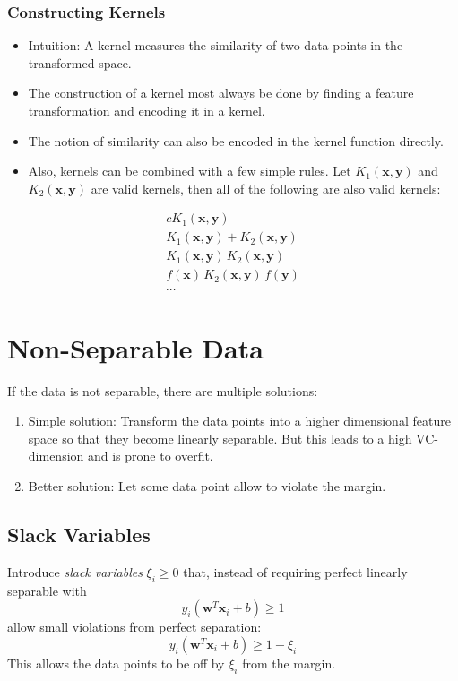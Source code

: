 \documentclass[a4paper, 11pt, accentcolor = tud3b]{tudreport}
\renewcommand{\vec}[1]{\mathbf{#1}}
\begin{document}
				\subsubsection{Constructing Kernels}
					\begin{itemize}
						\item Intuition: A kernel measures the similarity of two data points in the transformed space.
						\item The construction of a kernel most always be done by finding a feature transformation and encoding it in a kernel.
						\item The notion of similarity can also be encoded in the kernel function directly.
						\item Also, kernels can be combined with a few simple rules. Let \( K_1(\vec{x}, \vec{y}) \) and \( K_2(\vec{x}, \vec{y}) \) are valid kernels, then all of the following are also valid kernels:
					\end{itemize}
					\begin{gather}
						cK_1(\vec{x}, \vec{y}) \\
						K_1(\vec{x}, \vec{y}) + K_2(\vec{x}, \vec{y}) \\
						K_1(\vec{x}, \vec{y}) \, K_2(\vec{x}, \vec{y}) \\
						f(\vec{x}) \, K_2(\vec{x}, \vec{y}) \, f(\vec{y}) \\
						\cdots
					\end{gather}

		\section{Non-Separable Data}
			If the data is not separable, there are multiple solutions:
			\begin{enumerate}
				\item Simple solution: Transform the data points into a higher dimensional feature space so that they become linearly separable. But this leads to a high VC-dimension and is prone to overfit.
				\item Better solution: Let some data point allow to violate the margin.
			\end{enumerate}

			\subsection{Slack Variables}
				Introduce \emph{slack variables} \( \xi_i \geq 0 \) that, instead of requiring perfect linearly separable with
				\begin{equation}
					y_i (\vec{w}^T \vec{x}_i + b) \geq 1
				\end{equation}
				allow small violations from perfect separation:
				\begin{equation}
					y_i (\vec{w}^T \vec{x}_i + b) \geq 1 - \xi_i
				\end{equation}
				This allows the data points to be off by \( \xi_i \) from the margin.
				
\end{document}
